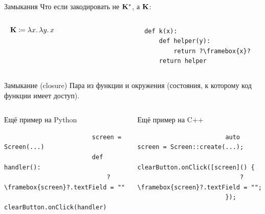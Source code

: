     \begin{frame}[fragile]{Замыкания}
        Что если закодировать не $\mathbf{K}^*$, а $\mathbf{K}$:
        \vspace{-1em}
        \begin{columns}[onlytextwidth]
            \begin{column}[t]{0.485\textwidth}
                \vspace{0.5em}
                \[\mathbf{K} \coloneqq \lambda x\ldotp \lambda y\ldotp x\]
            \end{column}\hfill%
            \begin{column}[t]{0.485\textwidth}
                \begin{verbatim}
                    def k(x):
                        def helper(y):
                            return ?\framebox{x}?
                        return helper
                \end{verbatim}
            \end{column}
        \end{columns}
        \pause
        \begin{block}{Замыкание (closure)}
            Пара из функции и окружения (состояния, к которому код функции имеет доступ).
        \end{block}
        \pause
        \vspace{-1em}
        \begin{columns}[onlytextwidth]
            \begin{column}[t]{0.485\textwidth}
                \begin{block}{Ещё пример на Python}
                    \begin{verbatim}
                        screen = Screen(...)
                        def handler():
                            ?\framebox{screen}?.textField = ""
                        clearButton.onClick(handler)
                    \end{verbatim}
                \end{block}
            \end{column}\hfill
            \pause%
            \begin{column}[t]{0.485\textwidth}
                \begin{block}{Ещё пример на C++}
                    \begin{verbatim}
                        auto screen = Screen::create(...);
                        clearButton.onClick([screen]() {
                            ?\framebox{screen}?.textField = "";
                        });
                    \end{verbatim}
                \end{block}
            \end{column}
        \end{columns}
    \end{frame}

